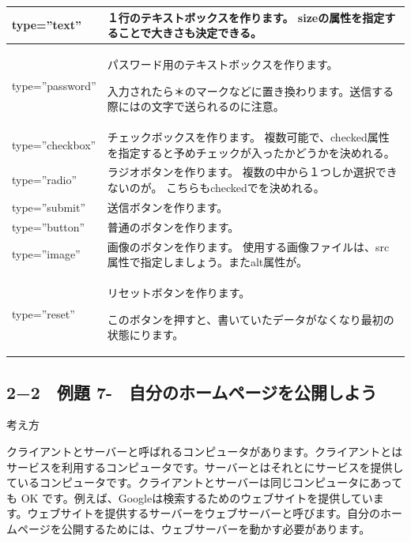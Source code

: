 \documentclass[a4paper,12pt,dvipdfmx]{jarticle}
\newcounter{Exercise}
\renewcommand\theExercise{例題 7-\arabic{Exercise}}
\begin{document}
\begin{flushleft}
	\tablefirsthead{}
	\tablehead{}
	\tabletail{}
	\tablelasttail{}
	\begin{supertabular}{|m{3.4459999cm}|m{7.9160004cm}|}
		\hline
		type=”text” &
		１行のテキストボックスを作ります。\newline
		sizeの属性を指定することで大きさも決定できる。\\\hline
		type=”password” &
		パスワード用のテキストボックスを作ります。\newline

		入力されたら＊のマークなどに置き換わります。送信する際にはの文字で送られるのに注意。\\\hline
		type=”checkbox” &
		チェックボックスを作ります。
		複数可能で、checked属性を指定すると予めチェックが入ったかどうかを決めれる。\\\hline
		type=”radio” &
		ラジオボタンを作ります。
		複数の中から１つしか選択できないのが。\newline
		こちらもcheckedでを決めれる。\\\hline
		type=”submit” &
		送信ボタンを作ります。\\\hline
		type=”button” &
		普通のボタンを作ります。\\\hline
		type=”image” &
		画像のボタンを作ります。\newline
		使用する画像ファイルは、src属性で指定しましょう。またalt属性が。\\\hline
		type=”reset” &
		リセットボタンを作ります。

		このボタンを押すと、書いていたデータがなくなり最初の状態にります。\\\hline
	\end{supertabular}
\end{flushleft}

\bigskip

\clearpage\subsection*{2−2　\theExercise　自分のホームページを公開しよう}
考え方


クライアントとサーバーと呼ばれるコンピュータがあります。クライアントとはサービスを利用するコンピュータです。サーバーとはそれとにサービスを提供しているコンピュータです。クライアントとサーバーは同じコンピュータにあっても
OK です。例えば、Googleは検索するためのウェブサイトを提供しています。ウェブサイトを提供するサーバーをウェブサーバーと呼びます。自分のホームページを公開するためには、ウェブサーバーを動かす必要があります。
\end{document}
